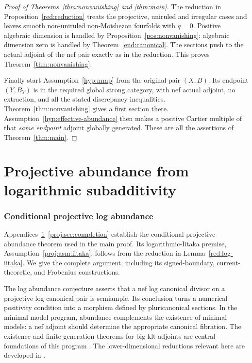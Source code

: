 \documentclass[11pt,letterpaper]{article}
\theoremstyle{definition}
\theoremstyle{remark}
\begin{document}
\begin{proof}[Proof of Theorems~\ref{thm:nonvanishing} and
\ref{thm:main}]
The reduction in Proposition~\ref{red:reduction} treats the
projective, uniruled and irregular cases and leaves smooth
non-uniruled non-Moishezon fourfolds with \(q=0\). Positive
algebraic dimension is handled by Proposition~\ref{pos:nonvanishing};
algebraic dimension zero is handled by
Theorem~\ref{end:canonical}. The sections push to the actual
adjoint of the nef pair exactly as in the reduction. This proves
Theorem~\ref{thm:nonvanishing}.

Finally start Assumption~\ref{hyp:mmp} from the original pair
\((X,B)\). Its endpoint \((Y,B_Y)\) is in the required global
strong category, with nef actual adjoint, no extraction, and all the
stated discrepancy inequalities. Theorem~\ref{thm:nonvanishing}
gives a first section there. Assumption~\ref{hyp:effective-abundance}
then makes a positive Cartier multiple of that \emph{same endpoint}
adjoint globally generated. These are all the assertions of
Theorem~\ref{thm:main}.
\end{proof}

\clearpage
\appendix
\part{Projective abundance from logarithmic subadditivity}
\section{Conditional projective log abundance}\label{proj:sec:introduction}

Appendices~\ref{proj:sec:introduction}--\ref{proj:sec:completion}
establish the conditional projective abundance theorem used in the main
proof. Its logarithmic-Iitaka premise,
Assumption~\ref{proj:asm:iitaka}, follows from the reduction in Lemma~\ref{red:log-iitaka}. We give the complete argument, including
its signed-boundary, current-theoretic, and Frobenius constructions.



The log abundance conjecture asserts that a nef log canonical divisor
on a projective log canonical pair is semiample. Its conclusion turns a
numerical positivity condition into a morphism defined by pluricanonical
sections. In the minimal model program, abundance complements the
existence of minimal models: a nef adjoint should determine the
appropriate canonical fibration. The existence and finite-generation
theorems for big klt adjoints are central foundations of this program
\cite{BCHM}. The lower-dimensional reductions relevant here are
developed in \cite{Proj-Hashizume2018,Proj-FujinoGongyoRings2014}.
\end{document}
